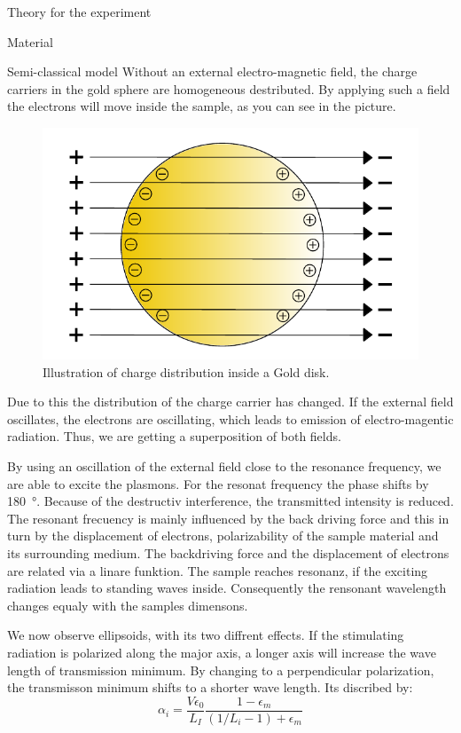 \documentclass[pdftex, a4paper,11pt, twoside, UKenglish]{report}
\begin{document}
\begin{chapter}{Theory for the experiment}
\begin{section}{Material}
    \end{section}

    \begin{section}{Semi-classical model}
        Without an external electro-magnetic field, the charge carriers in the
        gold sphere are homogeneous destributed.
        By applying such a field the electrons will move inside the sample, as
        you can see in the picture. 
        \begin{figure}[htbp]
          \centering
          \includegraphics[width=.6\textwidth]{Figures/SemiClassical.png}
          \caption{Illustration of charge distribution inside a Gold disk.}
          \label{fig:SemiClassical}
        \end{figure}
        Due to this the distribution of the charge carrier has changed.
        If the external field oscillates, the electrons are oscillating, which
        leads to emission of electro-magentic radiation.
        Thus, we are getting a superposition of both fields.

        By using an oscillation of the external field close to the resonance
        frequency, we are able to excite the plasmons.
        For the resonat frequency the phase shifts by \SI{180}{\degree}.
        Because of the destructiv interference, the transmitted intensity is
        reduced.
        The resonant frecuency is mainly influenced by the back driving force
        and this in turn by the displacement of electrons, polarizability of the
        sample material and its surrounding medium.
        The backdriving force and the displacement of electrons are related via
        a linare funktion.
        The sample reaches resonanz, if the exciting radiation leads to standing
        waves inside. 
        Consequently the rensonant wavelength changes equaly with the samples
        dimensons.  

        We now observe ellipsoids, with its two diffrent effects.
        If the stimulating radiation is polarized along the major axis, a longer
        axis will increase the wave length of transmission minimum.
        By changing to a perpendicular polarization, the transmisson minimum
        shifts to a shorter wave length.
        Its discribed by:
        \[ 
            \alpha_i = \frac{V\epsilon_0}{L_I}\frac{1-\epsilon_m}
            {(1/L_i-1)+\epsilon_m}
        \]



\end{section}
\end{chapter}
\end{document}
